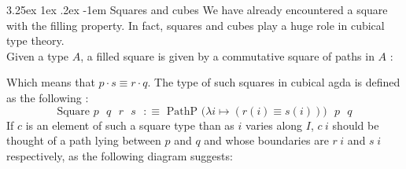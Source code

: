 \documentclass{report}
\makeatletter
\renewcommand\paragraph{\@startsection{paragraph}{5}{\z@}%
  {3.25ex \@plus1ex \@minus.2ex}%
  {-1em}%
  {\normalfont\normalsize\bfseries}}
\makeatother
\begin{document}
\paragraph{Squares and cubes} We have already encountered a square with the filling property. In fact, squares and cubes play a huge role in cubical type theory. \\
Given a type $A$, a filled square is given by a commutative square of paths in $A$ : 
\begin{center}
\end{center}
Which means that $\boxed{p \cdot s \equiv r \cdot q}$. The type of such squares in cubical agda is defined as the following : 
$$\text{Square $p$ $q$ $r$ $s$ $:\equiv$ PathP $\big(\lambda i \mapsto (r(i) \equiv s(i))\big)$ $p$ $q$}$$
If $c$ is an element of such a square type than as $i$ varies along $I$, $c \hspace{3pt} i$ should be thought of a path lying between $p$ and $q$ and whose boundaries are $r \hspace{3pt} i$ and $s \hspace{3pt} i$ respectively, as the following diagram suggests:
\begin{center}
\end{center}
\end{document}
